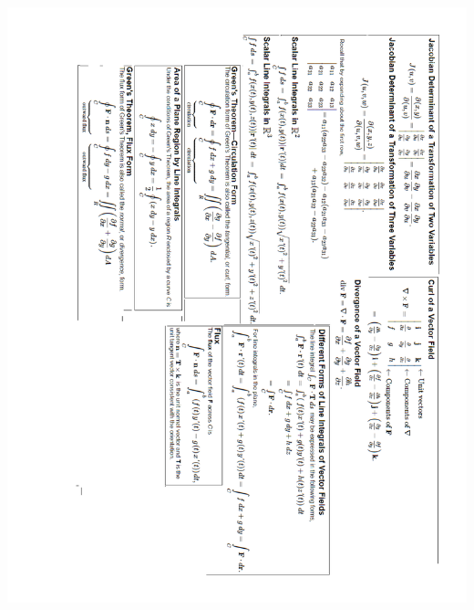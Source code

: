 \documentclass[12pt, addpoints]{exam/exam}
\theoremstyle{plain}
\begin{document}
\begin{coverpages}
\begin{center}
\vspace*{\fill}
\includegraphics[scale=0.84]{Exam3FormulaSheet.pdf}
\vspace*{\fill}
\end{center}

\newpage

\gradetable
\end{coverpages}
\end{document}
